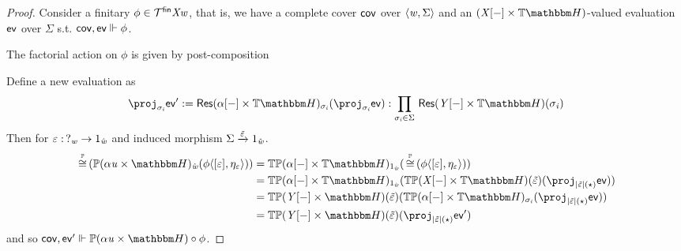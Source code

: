 \begin{proof}
Consider a finitary $\phi \in \mathcal{T}^{\mathsf{fin}}\mathit{X}\mathit{w}$, that is, we have a complete cover $\mathsf{cov}$ over $\langle\mathit{w}, \Sigma\rangle$ and an $(\vX\anyL\dash \times \theapF)$-valued evaluation $\mathsf{ev}$ over $\Sigma$ s.t. $\mathsf{cov},\mathsf{ev} \Vdash \phi$.

The factorial action on $\phi$ is given by post-composition
\begin{center}
\end{center}

Define a new evaluation as
\[ \proj_{\sigma_\vi} \ev' \eqdef \typeRes(\alpha\anyL\dash \times \theapF)_{\sigma_\vi}(\proj_{\sigma_\vi} \ev) : \Prod{\sigma_\vi \in \Sigma} \typeRes(\vY\anyL\dash \times \theapF)(\sigma_\vi) \]
Then for $\varepsilon :\, ?_{\mathit{w}} \to 1_{\hat{\mathit{w}}}$ and induced morphism $\Sigma \xrightarrow{\tilde{\varepsilon}} 1_{\hat{\mathit{w}}}$.
\begin{align*}
    \hmonIso(\hideMon(\alpha\tinstU \times \heapF)_{\hat\vw}(\phi\pair{\anyL\me}{\mvarM_\me})) & = 
    \thideMon(\alpha\anyL\dash \times \theapF)_{\inclITI{\hat\vw}} (\hmonIso(\phi\pair{\anyL\me}{\mvarM_\me})) \\
        &= \thideMon(\alpha\anyL\dash \times \theapF)_{\inclITI{\hat\vw}}(\thideMon(\vX\anyL\dash \times \theapF)(\tilde\me)(\proj_{\indF{\tilde\me}(\star)} \ev)) \\
        &= \thideMon(\vY\anyL\dash \times \heapF)(\tilde\me)(\thideMon(\alpha\anyL\dash \times \theapF)_{\sigma_\vi}(\proj_{\indF{\tilde\me}(\star)} \ev)) \\
        &= \thideMon(\vY\anyL\dash \times \heapF)(\tilde\me)(\proj_{\indF{\tilde\me}(\star)} \ev') \\
\end{align*}
    and so $\cov, \ev' \Vdash \hideMon(\alpha\tinstU \times \heapF) \comp \phi$.
\end{proof}

